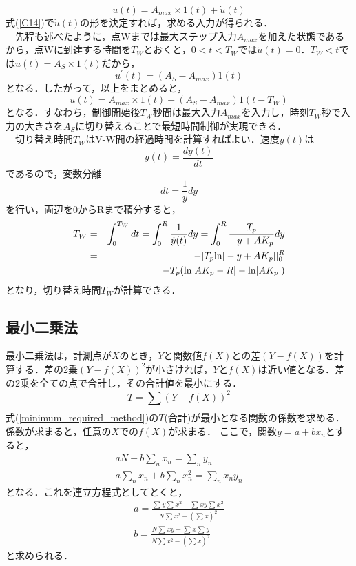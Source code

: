 \documentclass[12pt]{jsarticle}
\begin{document}
\begin{equation}
  \label{C14}
  u(t)=A_{max}×1(t) + \dot{u}(t)
\end{equation}
式(\ref{C14})で$\dot{u}(t)$の形を決定すれば，求める入力が得られる．\\
　先程も述べたように，点Wまでは最大ステップ入力$A_{max}$を加えた状態であるから，点Wに到達する時間を$T_W$とおくと，$0<t<T_W$では$\dot{u}(t)=0$．$T_W<t$では$u(t)=A_S×1(t)$だから，
\begin{equation}
  \label{C15}
  u^{\prime}(t)=(A_S-A_{max})1(t)
\end{equation}
となる．したがって，以上をまとめると，
\begin{equation}
  \label{C16}
  u(t)=A_{max}×1(t)+(A_S-A_{max})1(t-T_W)
\end{equation}
となる．すなわち，制御開始後$T_W$秒間は最大入力$A_{max}$を入力し，時刻$T_W$秒で入力の大きさを$A_S$に切り替えることで最短時間制御が実現できる．\\
　切り替え時間$T_W$はV-W間の経過時間を計算すればよい．速度$\dot{y}(t)$は
\begin{equation}
  \label{C17}
  \dot{y}(t)=\frac{dy(t)}{dt}
\end{equation}
であるので，変数分離
\begin{equation}
  \label{C18}
  dt = \frac{1}{\dot{y}}dy
\end{equation}
を行い，両辺を0からRまで積分すると，
\begin{eqnarray}
  \label{C19}
  T_W & = & \int_0^{T_W} dt = \int_0^R \frac{1}{\dot{y}(t)} dy = \int_0^R \frac{T_p}{-y+AK_p} dy\\
  & = & -[T_p {\rm ln}|-y+AK_p|]^R_0\\
  & = & -T_p({\rm ln}|AK_p-R|-{\rm ln}|AK_p|)
\end{eqnarray}
となり，切り替え時間$T_W$が計算できる．
\subsection{最小二乗法}
最小二乗法は，計測点が$X$のとき，$Y$と関数値$f(X)$との差$(Y-f(X))$を計算する．差の2乗$(Y-f(X))^2$が小さければ，$Y$と$f(X)$は近い値となる．差の2乗を全ての点で合計し，その合計値を最小にする．
\begin{equation}
  \label{minimum_required_method}
  T = \sum_{}^{}(Y-f(X))^2
\end{equation}
式(\ref{minimum_required_method})の$T$(合計)が最小となる関数の係数を求める．係数が求まると，任意の$X$での$f(X)$が求まる\cite{minimum_method}．
ここで，関数$y = a + bx_n$とすると，
\begin{eqnarray}
  \label{minimum_method}
  aN + b\sum_{n}^{}x_n = \sum_{n}^{}y_n \\
  a\sum_{n}^{}x_n + b\sum_{n}^{}x_n^2 = \sum_{n}^{}x_ny_n
\end{eqnarray}
となる．これを連立方程式としてとくと，
\begin{eqnarray}
a = \frac{\sum{}^{}y \sum{}^{}x^2 - \sum{}^{}xy\sum{}^{}x^2}{N\sum_{}^{}x^2 - (\sum_{}^{}x)^2}\\
b = \frac{N\sum{}^{}xy - \sum{}^{}x\sum{}^{}y}{N\sum_{}^{}x^2 - (\sum_{}^{}x)^2}
\end{eqnarray}
と求められる．
\end{document}
